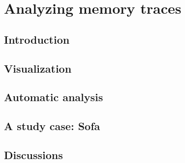 \chapter{Analyzing memory traces}


\section{Introduction}


\section{Visualization}


\section{Automatic analysis}


\section{A study case: Sofa}



\section{Discussions}

